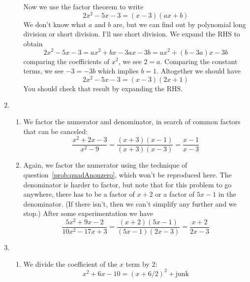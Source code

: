 \documentclass{article}
\begin{document}
\begin{enumerate}
\begin{enumerate}
    Now we use the factor theorem to write
    \begin{equation*}
      2x^2-5x-3 = (x-3)(ax+b)
    \end{equation*}
    We don't know what $a$ and $b$ are, but we can find out by polynomial
    long division or short division.  I'll use short division.  We expand
    the RHS to obtain
    \begin{equation*}
      2x^2-5x-3 = ax^2 + bx - 3ax -3b = ax^2 + (b-3a) x -3b
    \end{equation*}
    comparing the coefficients of $x^2$, we see $2=a$.  Comparing the 
    constant terms, we see $-3=-3b$ which implies $b=1$.  Altogether we 
    should have
    \begin{equation*}
      2x^2-5x-3 = (x-3)(2x+1)
    \end{equation*}
    You should check that result by expanding the RHS.
  \end{enumerate}
\item %
  \begin{enumerate}
  \item We factor the numerator and denominator, in search of common
    factors that can be canceled:
    \begin{equation*}
      \frac{x^2+2x-3}{x^2-9}
      = \frac{(x+3)(x-1)}{(x+3)(x-3)}
      = \frac{x-1}{x-3}
    \end{equation*}
  \item Again, we factor the numerator using the technique
    of question~\ref{prob:quadAnonzero}, which won't be reproduced here.
    The denominator is harder to factor, but note that for this problem
    to go anywhere, there has to be a factor of $x+2$ or a factor of 
    $5x-1$ in the denominator.  (If there isn't, then we can't simplify
    any further and we stop.) After some experimentation we have
    \begin{equation*}
      \frac{5x^2+9x-2}{10x^2-17x+3}
      = \frac{(x+2)(5x-1)}{(5x-1)(2x-3)} 
      = \frac{x+2}{2x-3}
    \end{equation*}
  \end{enumerate}
\item %
  \begin{enumerate}
  \item We divide the coefficient of the $x$ term by $2$:
    \begin{equation*}
      x^2+6x-10 = (x+6/2)^2 + \mbox{junk}

\end{equation*}
\end{enumerate}
\end{enumerate}
\end{document}
